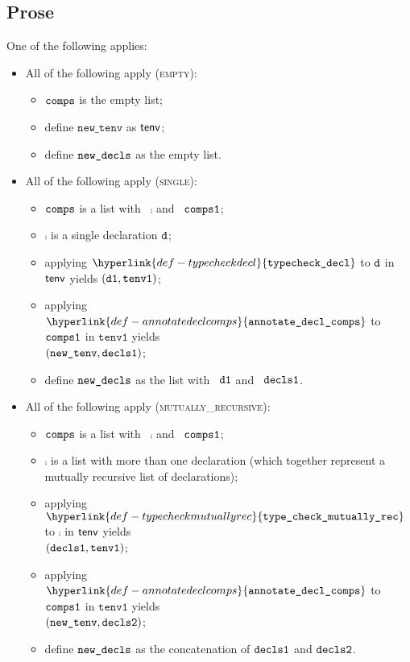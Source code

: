 \documentclass{book}
\newcommand\ProseOrTypeError[0]{\ProseTerminateAs{\TypeErrorConfig}}
\newcommand\typecheckdecl[0]{\hyperlink{def-typecheckdecl}{\texttt{typecheck\_decl}}}
\newcommand\typecheckmutuallyrec[0]{\hyperlink{def-typecheckmutuallyrec}{\texttt{type\_check\_mutually\_rec}}}
\newcommand\annotatedeclcomps[0]{\hyperlink{def-annotatedeclcomps}{\texttt{annotate\_decl\_comps}}}
\newcommand\newtenv[0]{\texttt{new\_tenv}}
\newcommand\tenvone[0]{\texttt{tenv1}}
\begin{document}
\subsection{Prose}
One of the following applies:
\begin{itemize}
  \item All of the following apply (\textsc{empty}):
  \begin{itemize}
    \item $\texttt{comps}$ is the empty list;
    \item define $\newtenv$ as $\textsf{tenv}$;
    \item define $\texttt{new\_decls}$ as the empty list.
  \end{itemize}

  \item All of the following apply (\textsc{single}):
  \begin{itemize}
    \item $\texttt{comps}$ is a list with \head\ $\comp$ and \tail\ $\texttt{comps1}$;
    \item $\comp$ is a single declaration $\texttt{d}$;
    \item applying $\typecheckdecl$ to $\texttt{d}$ in $\textsf{tenv}$ yields $(\vdone, \tenvone)$\ProseOrTypeError;
    \item applying $\annotatedeclcomps$ to $\texttt{comps1}$ in $\tenvone$ yields \\ $(\newtenv, \declsone)$\ProseOrTypeError;
    \item define $\texttt{new\_decls}$ as the list with \head\ $\texttt{d1}$ and \tail\ $\texttt{decls1}$.
  \end{itemize}

  \item All of the following apply (\textsc{mutually\_recursive}):
  \begin{itemize}
    \item $\texttt{comps}$ is a list with \head\ $\comp$ and \tail\ $\texttt{comps1}$;
    \item $\comp$ is a list with more than one declaration (which together represent a mutually recursive
          list of declarations);
    \item applying $\typecheckmutuallyrec$ to $\comp$ in $\textsf{tenv}$ yields \\ $(\declsone, \tenvone)$\ProseOrTypeError;
    \item applying $\annotatedeclcomps$ to $\texttt{comps1}$ in $\tenvone$ yields \\ $(\newtenv, \declstwo)$\ProseOrTypeError;
    \item define $\texttt{new\_decls}$ as the concatenation of $\texttt{decls1}$ and $\texttt{decls2}$.
  \end{itemize}
\end{itemize}
\end{document}
